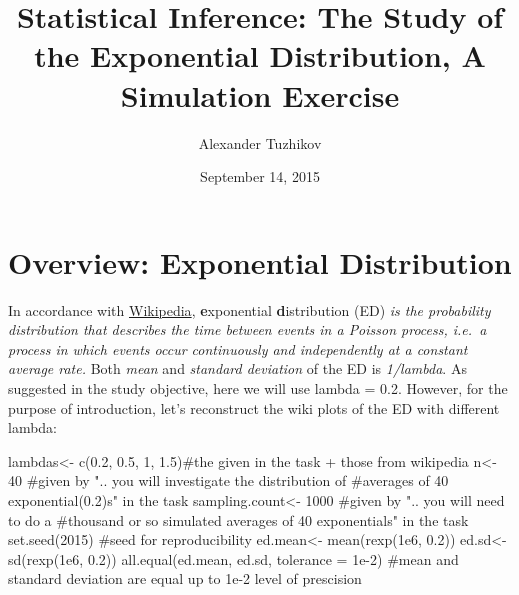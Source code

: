 \documentclass[9pt,]{article}
\title{Statistical Inference: The Study of the Exponential Distribution, A
Simulation Exercise}
\author{Alexander Tuzhikov}
\date{September 14, 2015}
\newenvironment{Shaded}{}{}
\newcommand{\KeywordTok}[1]{\textcolor[rgb]{0.00,0.00,1.00}{{#1}}}
\newcommand{\DataTypeTok}[1]{{#1}}
\newcommand{\DecValTok}[1]{{#1}}
\newcommand{\FloatTok}[1]{{#1}}
\newcommand{\StringTok}[1]{\textcolor[rgb]{0.00,0.50,0.50}{{#1}}}
\newcommand{\CommentTok}[1]{\textcolor[rgb]{0.00,0.50,0.00}{{#1}}}
\newcommand{\NormalTok}[1]{{#1}}
\begin{document}
\maketitle

{
\hypersetup{linkcolor=black}
\setcounter{tocdepth}{2}
\tableofcontents
}
\section{Overview: Exponential
Distribution}\label{overview-exponential-distribution}

In accordance with
\href{https://en.wikipedia.org/wiki/Exponential_distribution}{Wikipedia},
\textbf{e}xponential \textbf{d}istribution (ED) \emph{is the probability
distribution that describes the time between events in a Poisson
process, i.e.~a process in which events occur continuously and
independently at a constant average rate.} Both \emph{mean} and
\emph{standard deviation} of the ED is \emph{1/lambda}. As suggested in
the study objective, here we will use lambda = 0.2. However, for the
purpose of introduction, let's reconstruct the wiki plots of the ED with
different lambda:

\begin{Shaded}
\begin{Highlighting}[]
\NormalTok{lambdas<-}\StringTok{ }\KeywordTok{c}\NormalTok{(}\FloatTok{0.2}\NormalTok{, }\FloatTok{0.5}\NormalTok{, }\DecValTok{1}\NormalTok{, }\FloatTok{1.5}\NormalTok{)}\CommentTok{#the given in the task + those from wikipedia}
\NormalTok{n<-}\StringTok{ }\DecValTok{40} \CommentTok{#given by ".. you will investigate the distribution of }
       \CommentTok{#averages of 40 exponential(0.2)s" in the task}
\NormalTok{sampling.count<-}\StringTok{ }\DecValTok{1000}  \CommentTok{#given by ".. you will need to do a }
       \CommentTok{#thousand or so simulated averages of 40 exponentials" in the task}
\KeywordTok{set.seed}\NormalTok{(}\DecValTok{2015}\NormalTok{) }\CommentTok{#seed for reproducibility}
\NormalTok{ed.mean<-}\StringTok{ }\KeywordTok{mean}\NormalTok{(}\KeywordTok{rexp}\NormalTok{(}\FloatTok{1e6}\NormalTok{, }\FloatTok{0.2}\NormalTok{))}
\NormalTok{ed.sd<-}\StringTok{ }\KeywordTok{sd}\NormalTok{(}\KeywordTok{rexp}\NormalTok{(}\FloatTok{1e6}\NormalTok{, }\FloatTok{0.2}\NormalTok{))}
\KeywordTok{all.equal}\NormalTok{(ed.mean, ed.sd, }\DataTypeTok{tolerance =} \FloatTok{1e-2}\NormalTok{) }\CommentTok{#mean and standard deviation are equal up to 1e-2 level of prescision}
\end{Highlighting}
\end{Shaded}
\end{document}
